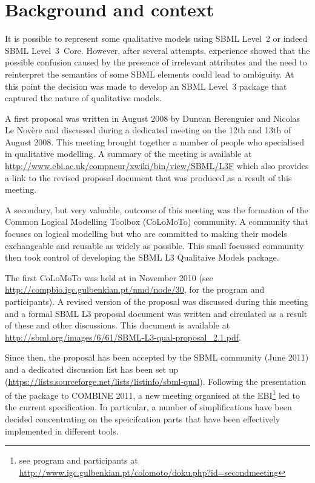 
\section{Background and context}
\label{background}

It is possible to represent some qualitative models using SBML Level~2 or indeed SBML Level~3~Core. However,  after several attempts, experience showed that the possible confusion caused by the presence of irrelevant attributes and the need to reinterpret the semantics of some SBML elements could lead to ambiguity. At this point the decision was made to develop an SBML Level~3 package that captured the nature of qualitative models.


A first proposal was written in August 2008 by Duncan Berenguier and Nicolas Le Nov\`ere and discussed during a dedicated meeting on the 12th and 13th of August 2008. This meeting brought together a number of people who specialised in qualitative modelling. A summary of the meeting is available at \url{http://www.ebi.ac.uk/compneur/xwiki/bin/view/SBML/L3F} which also provides a link to the revised proposal document that was produced as a result of this meeting.

A secondary, but very valuable, outcome of this meeting was the formation of the Common Logical Modelling Toolbox (CoLoMoTo) community. A community that focuses on logical modelling but who are committed to making their models exchangeable and reusable as widely as possible.  This small focussed community then took control of developing the SBML L3 Qualitaive Models package.

The first CoLoMoTo was held at in November 2010 (see \url{http://compbio.igc.gulbenkian.pt/nmd/node/30}, for the program and participants). A revised version of the proposal was discussed during this meeting and a formal SBML L3 proposal document was written and circulated as a result of these and other discussions.
This document is available at \url{http://sbml.org/images/6/61/SBML-L3-qual-proposal_2.1.pdf}.

Since then, the proposal has been accepted by the SBML community (June 2011) and a dedicated discussion list has been set up (\url{https://lists.sourceforge.net/lists/listinfo/sbml-qual}). Following the presentation of the package to COMBINE 2011, a new meeting organised at the EBI\footnote{see program and participants at \url{http://www.igc.gulbenkian.pt/colomoto/doku.php?id=secondmeeting}} led to the current specification. In particular, a number of simplifications have been decided concentrating on the speicifcation parts that have been effectively implemented in different tools. 

